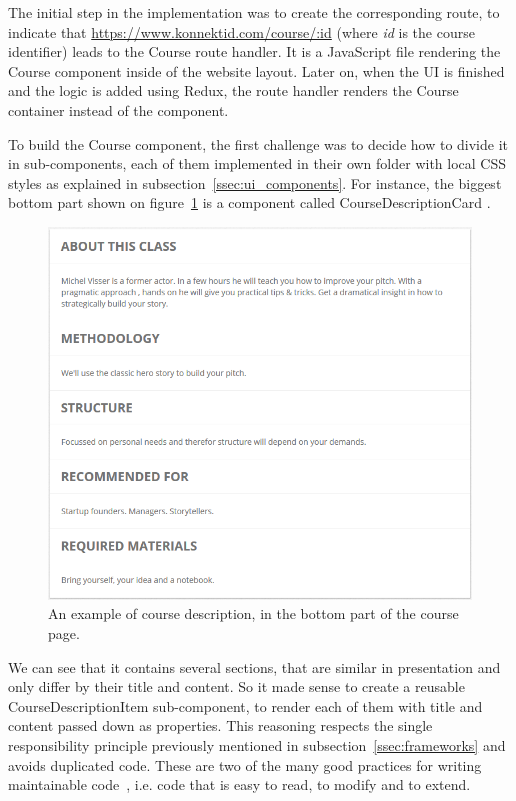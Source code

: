 The initial step in the implementation was to create the corresponding route, to indicate that \url{https://www.konnektid.com/course/:id} (where \textit{id} is the course identifier) leads to the \guillemotleft{} Course \guillemotright{} route handler. It is a JavaScript file rendering the Course component inside of the website layout. Later on, when the UI is finished and the logic is added using Redux, the route handler renders the Course container instead of the component.

To build the Course component, the first challenge was to decide how to divide it in sub-components, each of them implemented in their own folder with local CSS styles as explained in {\sc subsection}~\ref{ssec:ui_components}. For instance, the biggest bottom part shown on {\sc figure}~\ref{fig:courseDescription} is a component called \guillemotleft{} CourseDescriptionCard \guillemotright{}.

\begin{figure}[H]
    \centering
    \includegraphics[scale=0.6]{figure/courseDescription.png}
    \caption{An example of course description, in the bottom part of the course page.}
    \label{fig:courseDescription}
\end{figure} 

We can see that it contains several sections, that are similar in presentation and only differ by their title and content. So
it made sense to create a reusable \guillemotleft{} CourseDescriptionItem \guillemotright{} sub-component, to render each of them with title and content passed down as properties. This reasoning respects the single responsibility principle previously mentioned in {\sc subsection}~\ref{ssec:frameworks} and avoids duplicated code.
These are two of the many good practices for writing maintainable code~\cite{maintainable}, i.e. code that is easy to read, to modify and to extend.

